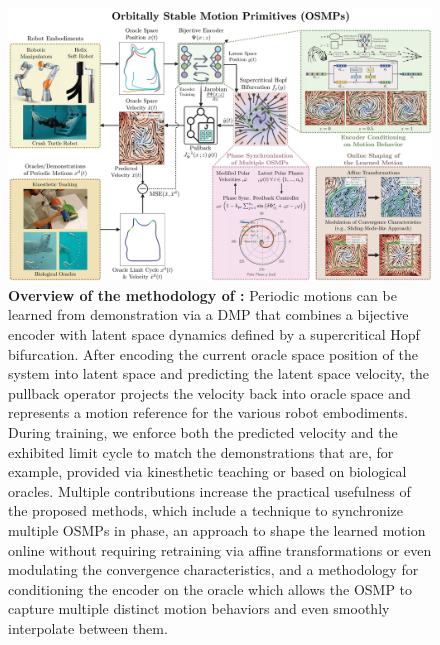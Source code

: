 \begin{figure}[h]
    \centering
    \includegraphics[width=1.0\linewidth]{osmp/figures/methodology_overview/osmp_methodology_overview_v2_compressed.pdf}
    \caption{
    \textbf{Overview of the methodology of :}
    Periodic motions can be learned from demonstration via a \gls{DMP} that combines a bijective encoder with latent space dynamics defined by a supercritical Hopf bifurcation. After encoding the current oracle space position of the system into latent space and predicting the latent space velocity, the pullback operator projects the velocity back into oracle space and represents a motion reference for the various robot embodiments. During training, we enforce both the predicted velocity and the exhibited limit cycle to match the demonstrations that are, for example, provided via kinesthetic teaching or based on biological oracles.
    Multiple contributions increase the practical usefulness of the proposed methods, which include a technique to synchronize multiple \glspl{OSMP} in phase, an approach to shape the learned motion online without requiring retraining via affine transformations or even modulating the convergence characteristics, and a methodology for conditioning the encoder on the oracle which allows the \gls{OSMP} to capture multiple distinct motion behaviors and even smoothly interpolate between them.
    }
    \label{fig:osmp:methodology_overview}
\end{figure}
